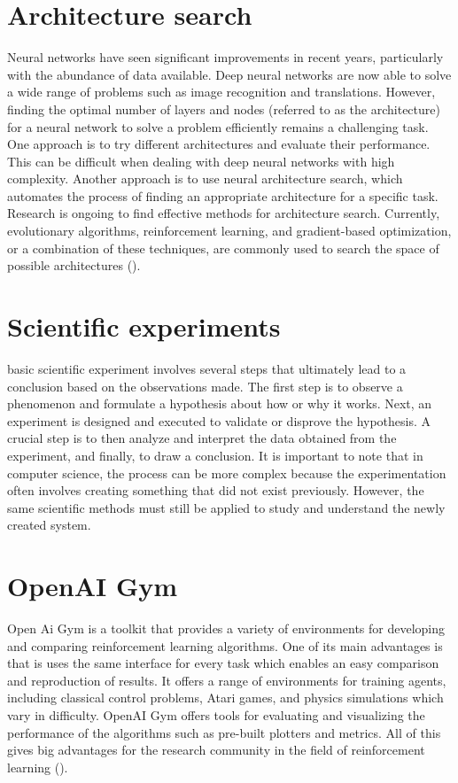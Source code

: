 \section{Architecture search}
Neural networks have seen significant improvements in recent years, particularly with the abundance of data available. Deep neural networks are now able to solve a wide range of problems such as image recognition and translations. However, finding the optimal number of layers and nodes (referred to as the architecture) for a neural network to solve a problem efficiently remains a challenging task. One approach is to try different architectures and evaluate their performance. This can be difficult when dealing with deep neural networks with high complexity. Another approach is to use neural architecture search, which automates the process of finding an appropriate architecture for a specific task. Research is ongoing to find effective methods for architecture search. Currently, evolutionary algorithms, reinforcement learning, and gradient-based optimization, or a combination of these techniques, are commonly used to search the space of possible architectures (\cite{elsken_neural_nodate}). 

\section{Scientific experiments}
 basic scientific experiment involves several steps that ultimately lead to a conclusion based on the observations made. The first step is to observe a phenomenon and formulate a hypothesis about how or why it works. Next, an experiment is designed and executed to validate or disprove the hypothesis. A crucial step is to then analyze and interpret the data obtained from the experiment, and finally, to draw a conclusion. It is important to note that in computer science, the process can be more complex because the experimentation often involves creating something that did not exist previously. However, the same scientific methods must still be applied to study and understand the newly created system.

\section{OpenAI Gym}

Open Ai Gym is a toolkit that provides a variety of environments for developing and comparing reinforcement learning algorithms. One of its main advantages is that is uses the same interface for every task which enables an easy comparison and reproduction of results. It offers a range of environments for training agents, including classical control problems, Atari games, and physics simulations which vary in difficulty. OpenAI Gym offers tools for evaluating and visualizing the performance of the algorithms such as pre-built plotters and metrics. All of this gives big advantages for the research community in the field of reinforcement learning (\cite{noauthor_openai_2016}). 

